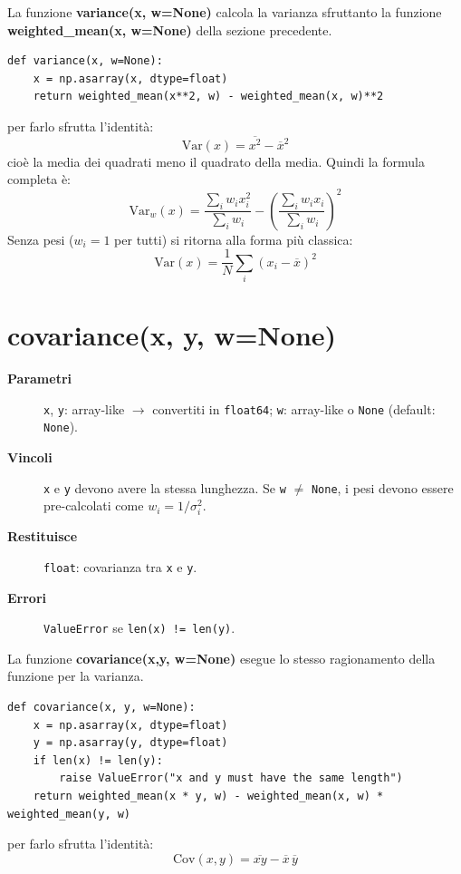 La funzione \textbf{variance(x, w=None)} calcola la varianza sfruttanto la funzione \textbf{weighted\_mean(x, w=None)} della sezione precedente.
\begin{verbatim}
def variance(x, w=None):
    x = np.asarray(x, dtype=float)
    return weighted_mean(x**2, w) - weighted_mean(x, w)**2
\end{verbatim}

per farlo sfrutta l'identità:
$$\text{Var}(x) = \overline{x^2} - \overline{x}^2$$
cioè la media dei quadrati meno il quadrato della media. Quindi la formula completa è:
$$\text{Var}_w(x) = \frac{\sum_i w_i x_i^2}{\sum_i w_i} - \left( \frac{\sum_i w_i x_i}{\sum_i w_i} \right)^2$$
Senza pesi ($w_i = 1$ per tutti) si ritorna alla forma più classica:
$$\text{Var}(x) = \frac{1}{N} \sum_i (x_i - \overline{x})^2$$




\section{covariance(x, y, w=None)}
\label{sec:covariance}
\begin{description}
  \item[\textbf{Parametri}]
    \texttt{x}, \texttt{y}: array-like $\to$ convertiti in \texttt{float64};
    \texttt{w}: array-like o \texttt{None} (default: \texttt{None}).
  \item[\textbf{Vincoli}]
    \texttt{x} e \texttt{y} devono avere la stessa lunghezza.
    Se \texttt{w} $\neq$ \texttt{None}, i pesi devono essere pre-calcolati come
    $w_i = 1/\sigma_i^2$.
  \item[\textbf{Restituisce}]
    \texttt{float}: covarianza tra \texttt{x} e \texttt{y}.
  \item[\textbf{Errori}]
    \texttt{ValueError} se \texttt{len(x) != len(y)}.
\end{description}

La funzione \textbf{covariance(x,y, w=None)} esegue lo stesso ragionamento della funzione per la varianza.

\begin{verbatim}
def covariance(x, y, w=None):
    x = np.asarray(x, dtype=float)
    y = np.asarray(y, dtype=float)
    if len(x) != len(y):
        raise ValueError("x and y must have the same length")
    return weighted_mean(x * y, w) - weighted_mean(x, w) * weighted_mean(y, w)
\end{verbatim}
per farlo sfrutta l'identità:
$$\text{Cov}(x,y) = \overline{xy} - \overline{x}\,\overline{y}$$

